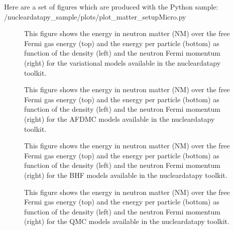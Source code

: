 \documentclass[letterpaper,10pt,english]{sphinxmanual}
\begin{document}
\sphinxAtStartPar
Here are a set of figures which are produced with the Python sample: /nucleardatapy\_sample/plots/plot\_matter\_setupMicro.py

\begin{figure}[htbp]
\centering
\capstart

\noindent{}
\caption{This figure shows the energy in neutron matter (NM) over the free Fermi gas energy (top) and the energy per particle (bottom) as function of the density (left) and the neutron Fermi momentum (right) for the variational models available in the nucleardatapy toolkit.}\label{\detokenize{source/api/setup_matter_micro:id1}}\end{figure}

\begin{figure}[htbp]
\centering
\capstart

\noindent{}
\caption{This figure shows the energy in neutron matter (NM) over the free Fermi gas energy (top) and the energy per particle (bottom) as function of the density (left) and the neutron Fermi momentum (right) for the AFDMC models available in the nucleardatapy toolkit.}\label{\detokenize{source/api/setup_matter_micro:id2}}\end{figure}

\begin{figure}[htbp]
\centering
\capstart

\noindent{}
\caption{This figure shows the energy in neutron matter (NM) over the free Fermi gas energy (top) and the energy per particle (bottom) as function of the density (left) and the neutron Fermi momentum (right) for the BHF models available in the nucleardatapy toolkit.}\label{\detokenize{source/api/setup_matter_micro:id3}}\end{figure}

\begin{figure}[htbp]
\centering
\capstart

\noindent{}
\caption{This figure shows the energy in neutron matter (NM) over the free Fermi gas energy (top) and the energy per particle (bottom) as function of the density (left) and the neutron Fermi momentum (right) for the QMC models available in the nucleardatapy toolkit.}\label{\detokenize{source/api/setup_matter_micro:id4}}\end{figure}
\end{document}
